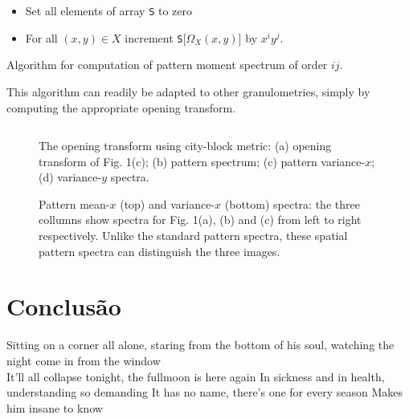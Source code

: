 \documentclass{sciposter}
\begin{document}
\begin{multicols}{3}
\begin{algorithm}
\begin{itemize}
\item Set all elements of array {\tt S} to zero
\item For all $(x,y) \in X$ increment {\tt S}[$\Omega_X(x,y)$] by
$x^iy^j$.
\end{itemize}
\caption{ Algorithm for computation of pattern moment
spectrum of order $ij$. \label{alg:spect}}
\end{algorithm}

This algorithm can
readily be adapted to other granulometries, simply by computing the
appropriate opening transform.

\begin{figure}
\begin{center}
\begin{tabular}{c c}

\end{tabular}
\end{center}
\caption{ \label{fig:tauspect}
The opening transform using city-block metric: (a) opening transform of
Fig. 1(c); (b) pattern spectrum; (c) pattern variance-$x$;
(d) variance-$y$ spectra.}
\end{figure}


\renewcommand{\imsize}{0.3\columnwidth}
\begin{figure}
\begin{center}
\end{center}
\caption{ \label{fig:binspect} Pattern mean-$x$ (top) and variance-$x$
(bottom) spectra: the three collumns show spectra for Fig. 1(a), (b) and (c)
from left to right respectively.  Unlike the standard pattern spectra,
these spatial pattern spectra can distinguish the three images.}
\end{figure}

\section{Conclusão}

Sitting on a corner all alone,
staring from the bottom of his soul,
watching the night come in from the window
\\
It'll all collapse tonight, the fullmoon is here again
In sickness and in health, understanding so demanding
It has no name, there's one for every season
Makes him insane to know
\\
 


\end{multicols}
\end{document}

